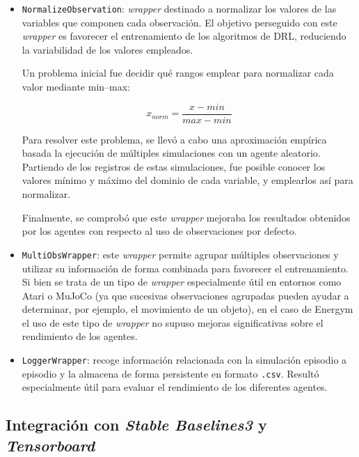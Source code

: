 \begin{itemize}
    \item \texttt{NormalizeObservation}: \textit{wrapper} destinado a normalizar los valores de las variables que componen cada observación. El objetivo perseguido con este \textit{wrapper} es favorecer el entrenamiento de los algoritmos de DRL, reduciendo la variabilidad de los valores empleados. 
    
    Un problema inicial fue decidir qué rangos emplear para normalizar cada valor mediante min--max:
    
    \begin{equation}
        x_{norm} = \frac{x - min}{max - min}
    \end{equation}
    
    Para resolver este problema, se llevó a cabo una aproximación empírica basada la ejecución de múltiples simulaciones con un agente aleatorio. Partiendo de los registros de estas simulaciones, fue posible conocer los valores mínimo y máximo del dominio de cada variable, y emplearlos así para normalizar.
    
    Finalmente, se comprobó que este \textit{wrapper} mejoraba los resultados obtenidos por los agentes con respecto al uso de observaciones por defecto.
    
    \item \texttt{MultiObsWrapper}: este \textit{wrapper} permite agrupar múltiples observaciones y utilizar su información de forma combinada para favorecer el entrenamiento. Si bien se trata de un tipo de \textit{wrapper} especialmente útil en entornos como Atari o MuJoCo (ya que sucesivas observaciones agrupadas pueden ayudar a determinar, por ejemplo, el movimiento de un objeto), en el caso de Energym el uso de este tipo de \textit{wrapper} no supuso mejoras significativas sobre el rendimiento de los agentes.
    
    \item \texttt{LoggerWrapper}: recoge información relacionada con la simulación episodio a episodio y la almacena de forma persistente en formato \texttt{.csv}. Resultó especialmente útil para evaluar el rendimiento de los diferentes agentes.
\end{itemize}

\subsection{Integración con \textit{Stable Baselines3} y \textit{Tensorboard}}


